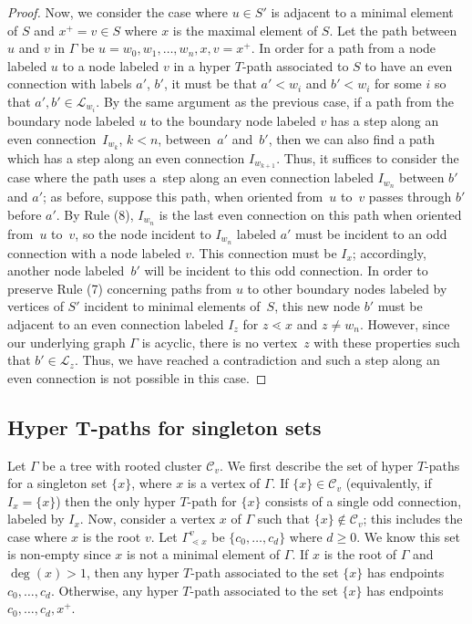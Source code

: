 \documentclass[pdftex]{sigma}
\numberwithin{equation}{section}
\newcommand{\new}[1]{{#1}}
\begin{document}
\begin{proof}
Now, we consider the case where $u \in S'$ is adjacent to a minimal element of $S$ and $x^+ = v \in S$ where $x$ is the maximal element of $S$. Let the path between $u$ and $v$ in $\Gamma$ be $u = w_0, w_1,\ldots, w_n, x, v = x^+$. In order for a path from a node labeled $u$ to a node labeled $v$ in a hyper $T$-path associated to $S$ to have an even connection with labels $a'$, $b'$, it must be that $a' < w_i$ and $b' < w_i$ for some $i$ so that $a',b' \in \mathcal{L}_{w_i}$. By the same argument as the previous case, if a path from the boundary node labeled $u$ to the boundary node labeled $v$ has a step along an even connection~$I_{w_k}$, $k < n$, between~$a'$ and~$b'$, then we can also find a path which has a step along an even connection $I_{w_{k+1}}$. Thus, it suffices to consider the case where the path uses a~step along an even connection labeled $I_{w_n}$ between $b'$ and $a'$; as before, suppose this path, when oriented from~$u$ to~$v$ passes through $b'$ before $a'$. By Rule (8), $I_{w_n}$ is the last even connection on this path when oriented from~$u$ to~$v$, so the node incident to \new{$I_{w_n}$} labeled $a'$ must be incident to an odd connection with a node labeled $v$. This connection must be $I_x$; accordingly, another node labeled~$b'$ will be incident to this odd connection. In order to preserve Rule (7) concerning paths from $u$ to other boundary nodes labeled by vertices of $S'$ incident to minimal elements of~$S$, this new node $b'$ must be adjacent to an even connection labeled $I_z$ for $z \lessdot x$ and $z \neq w_{n}$. However, since our underlying graph $\Gamma$ is acyclic, there is no vertex~$z$ with these properties such that $b' \in \mathcal{L}_z$. Thus, we have reached a contradiction and such a step along an even connection is not possible in this case.
\end{proof}

\subsection[Hyper T-paths for singleton sets]{Hyper $\boldsymbol{T}$-paths for singleton sets}\label{sec:single-sets}

Let $\Gamma$ be a tree with rooted cluster $\mathcal{C}_{v}$. We first describe the set of hyper $T$-paths for a singleton set $\{x\}$, where $x$ is a vertex of $\Gamma$.
If $\{x\} \in \mathcal{C}_v$ (equivalently, if $I_{x} = \{x\}$) then the only hyper $T$-path for $\{x\}$ consists of a single odd connection, labeled by $I_{x}$. Now, consider a vertex $x$ of $\Gamma$ such that $\{x\} \notin \mathcal{C}_v$; this includes the case where $x$ is the root $v$.
Let $\Gamma_{\lessdot x}^v$ be $\{c_0,\ldots,c_d\}$ where $d \geq 0$. We know this set is non-empty since $x$ is not a minimal element of $\Gamma$. If $x$ is the root of $\Gamma$ and $\deg(x) > 1$, then any hyper $T$-path associated to the set $\{x\}$ has endpoints $c_0,\ldots,c_d$. Otherwise, any hyper $T$-path associated to the set $\{x\}$ has endpoints $c_0,\ldots,c_d,x^+$.
\end{document}
